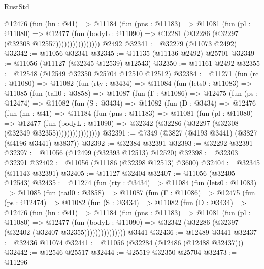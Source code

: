 \begin{lexlean}{RustStd}
\begin{coremodule}
                    @12476
                      (fun (hn : @41) =>
                      @11184
                        (fun (pns : @11183) =>
                        @11081
                          (fun (pl : @11080) =>
                          @12477
                            (fun (bodyL : @11090) =>
                            @32281 (@32286 (@32297 (@32308 @12557))))))))))))))))
    @2492
@32341 := @32279 (@11073 @2492)
@32342 := @11056 @32341
@32345 := @11135 (@11136 @2492) @25701
@32349 := @11056 (@11127 (@32345 @12539) @12543)
@32350 := @11161 @2492
@32355 := @12548 (@12549 @32350 @25704 @12510 @12512)
@32384 := @11271
    (fun (rc : @11080) =>
    @11082
      (fun (rty : @3434) =>
      @11084
        (fun (lets0 : @11083) =>
        @11085
          (fun (tail0 : @3858) =>
          @11087
            (fun (Γ : @11086) =>
            @12475
              (fun (ps : @12474) =>
              @11082
                (fun (S : @3434) =>
                @11082
                  (fun (D : @3434) =>
                  @12476
                    (fun (hn : @41) =>
                    @11184
                      (fun (pns : @11183) =>
                      @11081
                        (fun (pl : @11080) =>
                        @12477
                          (fun (bodyL : @11090) =>
                          @32342 (@32286 (@32297 (@32308 (@32349 @32355))))))))))))))))
@32391 := @7349 (@3827 (@4193 @3441) (@3827 (@4196 @3441) @3837))
@32392 := @32384 @32391
@32393 := @32292 @32391
@32397 := @11056 (@12499 (@32393 @12513) @12520)
@32398 := @32303 @32391
@32402 := @11056 (@11186 (@32398 @12513) @3600)
@32404 := @32345 (@11143 @32391)
@32405 := @11127 @32404
@32407 := @11056 (@32405 @12543)
@32435 := @11274
    (fun (rty : @3434) =>
    @11084
      (fun (lets0 : @11083) =>
      @11085
        (fun (tail0 : @3858) =>
        @11087
          (fun (Γ : @11086) =>
          @12475
            (fun (ps : @12474) =>
            @11082
              (fun (S : @3434) =>
              @11082
                (fun (D : @3434) =>
                @12476
                  (fun (hn : @41) =>
                  @11184
                    (fun (pns : @11183) =>
                    @11081
                      (fun (pl : @11080) =>
                      @12477
                        (fun (bodyL : @11090) =>
                        @32342 (@32286 (@32397 (@32402 (@32407 @32355)))))))))))))))
    @3441
@32436 := @12489 @3441
@32437 := @32436 @11074
@32441 := @11056 (@32284 (@12486 (@12488 @32437)))
@32442 := @12546 @25517
@32444 := @25519 @32350 @25704
@32473 := @11296

\end{coremodule}
\end{lexlean}
